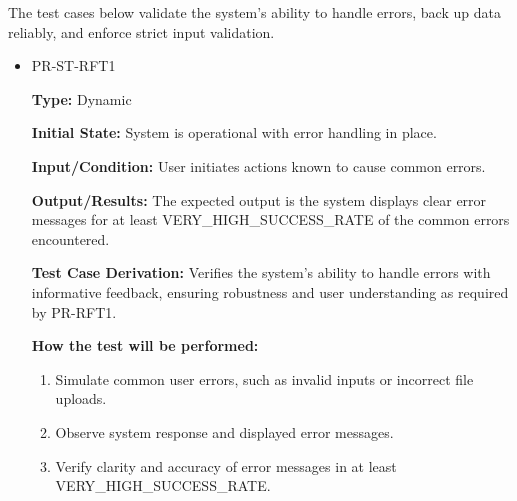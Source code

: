 \documentclass[12pt, titlepage]{article}
\begin{document}
\hspace{2em}The test cases below validate the system’s ability to handle errors, 
back up data reliably, and enforce strict input validation.

\begin{itemize}
  \item PR-ST-RFT1
  \begin{mdframed}[linewidth=0.5mm]
      \textbf{Type:} Dynamic \par
      \textbf{Initial State:} System is operational with error handling in place. \par
      \textbf{Input/Condition:} User initiates actions known to cause common errors. \par
      \textbf{Output/Results:} The expected output is the system displays clear error messages for at least VERY\_HIGH\_SUCCESS\_RATE of the common errors encountered. \par
      \textbf{Test Case Derivation:} Verifies the system’s ability to handle errors with \\ informative feedback, ensuring robustness and user understanding as required by PR-RFT1. \par
      \textbf{How the test will be performed:}
      \begin{enumerate}[noitemsep]
        \item Simulate common user errors, such as invalid inputs or incorrect file uploads.
        \item Observe system response and displayed error messages.
        \item Verify clarity and accuracy of error messages in at least \\VERY\_HIGH\_SUCCESS\_RATE.
      \end{enumerate}
  \end{mdframed}


\end{itemize}
\end{document}
